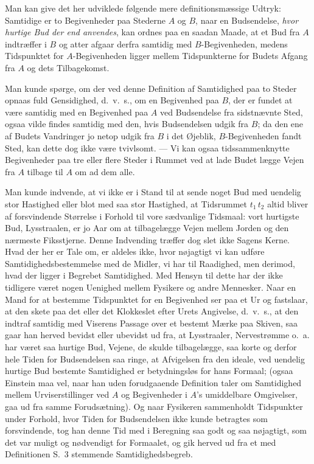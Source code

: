 \documentclass[12pt,a4paper]{article}
\newcommand{\opage}[1]{\marginnote{\footnotesize\textit{[#1]}}}
\begin{document}
Man kan give det her udviklede følgende mere definitionsmæssige Udtryk:
Samtidige er to Begivenheder paa Stederne $A$ og $B$, naar en Budsendelse,
\emph{hvor hurtige Bud der end anvendes}, kan ordnes paa en saadan Maade, at et
Bud fra $A$ indtræffer i $B$ og atter afgaar derfra samtidig med
\guillemotright $B$-Begivenheden\guillemotleft, medens Tidspunktet for
\guillemotright $A$-Begivenheden\guillemotleft{} ligger mellem Tidspunkterne
for Budets Afgang fra $A$ og dets Tilbagekomst.

Man kunde spørge, om der ved denne Definition af Samtidighed paa to Steder
opnaas fuld Gensidighed, d.~v.~s., om en Begivenhed paa $B$, der er fundet at
være samtidig med en Begivenhed paa $A$ ved Budsendelse fra sidstnævnte Sted,
ogsaa vilde findes samtidig med den, hvis Budsendelsen udgik fra $B$; da den
ene af Budets Vandringer jo netop udgik fra $B$ i det Øjeblik,
$B$-Begivenheden fandt Sted, kan dette dog ikke være tvivlsomt. --- Vi kan
ogsaa tidssammenknytte Begivenheder paa tre eller flere Steder i Rummet ved at
lade Budet lægge Vejen fra $A$ tilbage til $A$ om ad dem alle.

Man kunde indvende, at vi ikke er i Stand til at sende noget Bud med uendelig
stor Hastighed eller blot med saa stor Hastighed, at Tidsrummet $t_{1}\,t_{2}$
altid bliver af forsvindende Størrelse i Forhold til vore sædvanlige Tidsmaal:
vort hurtigste Bud, Lysstraalen, er jo Aar om at tilbagelægge Vejen mellem
Jorden og den nærmeste Fiksstjerne. Denne Indvending træffer dog slet ikke
Sagens Kerne. Hvad der her er Tale om, er aldeles ikke, hvor nøjagtigt vi kan
udføre Samtidighedsbestemmelse med de Midler, vi har til Raadighed, men
derimod, hvad der ligger i Begrebet Samtidighed. Med Hensyn til dette har der
ikke tidligere været nogen Uenighed mellem Fysikere og andre Mennesker. Naar en
Mand for at bestemme Tidspunktet for en Begivenhed ser paa et Ur og fastslaar,
at den skete paa det eller det Klokkeslet efter Urets Angivelse, d.~v.~s., at
den indtraf samtidig med Viserens Passage over et bestemt Mærke paa Skiven, saa
gaar han herved bevidst eller ubevidst ud fra, at Lysstraaler, Nervestrømme
o.~a. har været saa hurtige Bud, Vejene, de skulde
\opage{4} tilbagelægge, saa korte og derfor hele Tiden for Budsendelsen saa ringe, at
Afvigelsen fra den ideale, ved uendelig hurtige Bud bestemte Samtidighed er
betydningsløs for hans Formaal; (ogsaa Einstein maa vel, naar han uden
forudgaaende Definition taler om Samtidighed mellem Urviserstillinger ved $A$
og Begivenheder i \guillemotright $A$'s umiddelbare
Omgivelser\guillemotleft, gaa ud fra samme Forudsætning). Og naar Fysikeren
sammenholdt Tidspunkter under Forhold, hvor Tiden for Budsendelsen ikke kunde
betragtes som forsvindende, tog han denne Tid med i Beregning saa godt og saa
nøjagtigt, som det var muligt og nødvendigt for Formaalet, og gik herved ud fra
et med Definitionen S.~3 stemmende Samtidighedsbegreb.
\end{document}
